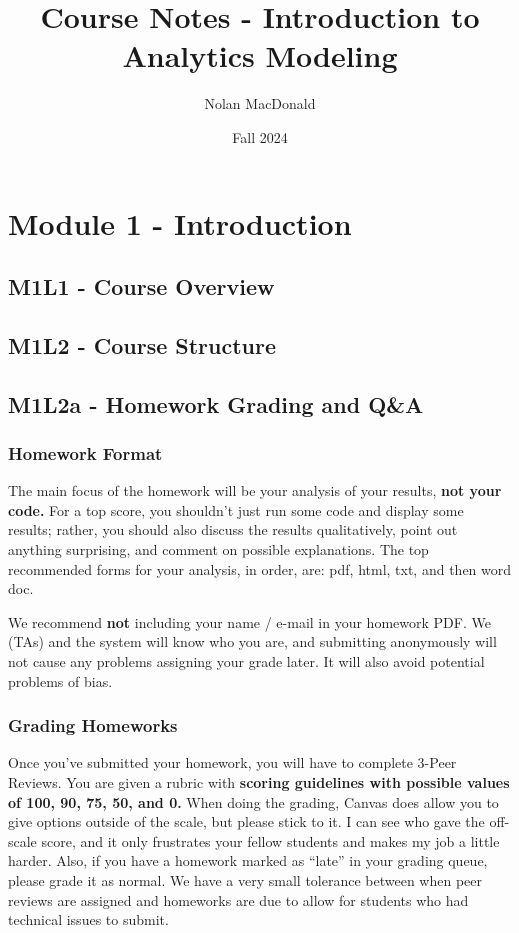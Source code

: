 \documentclass[
]{book}
\title{Course Notes - Introduction to Analytics Modeling}
\author{Nolan MacDonald}
\date{Fall 2024}
\begin{document}
\maketitle

{
\setcounter{tocdepth}{1}
\tableofcontents
}
\chapter{Module 1 - Introduction}\label{module-1---introduction}

\section{M1L1 - Course Overview}\label{m1l1---course-overview}

\section{M1L2 - Course Structure}\label{m1l2---course-structure}

\section{M1L2a - Homework Grading and Q\&A}\label{m1l2a---homework-grading-and-qa}

\subsection{Homework Format}\label{homework-format}

The main focus of the homework will be your analysis of your results, \textbf{not your code.}
For a top score, you shouldn't just run some code and display some results; rather, you should also discuss the results qualitatively, point out anything surprising, and comment on possible explanations.
The top recommended forms for your analysis, in order, are: pdf, html, txt, and then word doc.

We recommend \textbf{not} including your name / e-mail in your homework PDF.
We (TAs) and the system will know who you are, and submitting anonymously will not cause any problems assigning your grade later.
It will also avoid potential problems of bias.

\subsection{Grading Homeworks}\label{grading-homeworks}

Once you've submitted your homework, you will have to complete 3-Peer Reviews.
You are given a rubric with \textbf{scoring guidelines with possible values of 100, 90, 75, 50, and 0.}
When doing the grading, Canvas does allow you to give options outside of the scale, but please stick to it.
I can see who gave the off-scale score, and it only frustrates your fellow students and makes my job a little harder.
Also, if you have a homework marked as ``late'' in your grading queue, please grade it as normal.
We have a very small tolerance between when peer reviews are assigned and homeworks are due to allow for students who had technical issues to submit.
\end{document}
